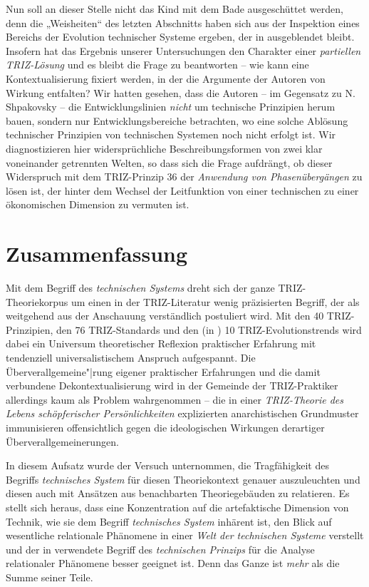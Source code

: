 \documentclass[11pt,a4paper]{article}
\begin{document}
Nun soll an dieser Stelle nicht das Kind mit dem Bade ausgeschüttet werden,
denn die „Weisheiten“ des letzten Abschnitts haben sich aus der Inspektion
eines Bereichs der Evolution technischer Systeme ergeben, der in
\cite{TESE2018} ausgeblendet bleibt.  Insofern hat das Ergebnis unserer
Untersuchungen den Charakter einer \emph{partiellen TRIZ-Lösung} und es bleibt
die Frage zu beantworten -- wie kann eine Kontextualisierung fixiert werden,
in der die Argumente der Autoren von \cite{TESE2018} Wirkung entfalten? Wir
hatten gesehen, dass die Autoren -- im Gegensatz zu N. Shpakovsky
\cite{Shpakovsky2010} -- die Entwicklungslinien \emph{nicht} um technische
Prinzipien herum bauen, sondern nur Entwicklungsbereiche betrachten, wo eine
solche Ablösung technischer Prinzipien von technischen Systemen noch nicht
erfolgt ist.  Wir diagnostizieren hier widersprüchliche Beschreibungsformen
von zwei klar voneinander getrennten Welten, so dass sich die Frage aufdrängt,
ob dieser Widerspruch mit dem TRIZ-Prinzip 36 der \emph{Anwendung von
  Phasenübergängen} zu lösen ist, der hinter dem Wechsel der Leitfunktion von
einer technischen zu einer ökonomischen Dimension zu vermuten ist. 

\section{Zusammenfassung}

Mit dem Begriff des \emph{technischen Systems} dreht sich der ganze
TRIZ-Theoriekorpus um einen in der TRIZ-Literatur wenig präzisierten Begriff,
der als weitgehend aus der Anschauung verständlich postuliert wird. Mit den 40
TRIZ-Prinzipien, den 76 TRIZ-Standards und den (in \cite{TESE2018}) 10
TRIZ-Evolutionstrends wird dabei ein Universum theoretischer Reflexion
praktischer Erfahrung mit tendenziell universalistischem Anspruch aufgespannt.
Die Überverallgemeine"|rung eigener praktischer Erfahrungen und die damit
verbundene Dekontextualisierung wird in der Gemeinde der TRIZ-Praktiker
allerdings kaum als Problem wahrgenommen -- die in einer \emph{TRIZ-Theorie
  des Lebens schöpferischer Persönlichkeiten} explizierten anarchistischen
Grundmuster immunisieren offensichtlich gegen die ideologischen Wirkungen
derartiger Überverallgemeinerungen.

In diesem Aufsatz wurde der Versuch unternommen, die Tragfähigkeit des
Begriffs \emph{technisches System} für diesen Theoriekontext genauer
auszuleuchten und diesen auch mit Ansätzen aus benachbarten Theoriegebäuden zu
relatieren.  Es stellt sich heraus, dass eine Konzentration auf die
artefaktische Dimension von Technik, wie sie dem Begriff  \emph{technisches
  System} inhärent ist, den Blick auf wesentliche relationale Phänomene in
einer \emph{Welt der technischen Systeme} verstellt und der in
\cite{Shpakovsky2010} verwendete Begriff des \emph{technischen Prinzips} für
die Analyse relationaler Phänomene besser geeignet ist. Denn das Ganze ist
\emph{mehr} als die Summe seiner Teile.
\end{document}
